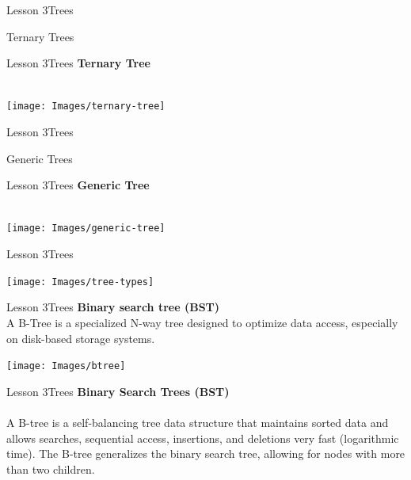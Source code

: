 \documentclass[aspectratio=1610]{beamer}
\begin{document}
\begin{frame}{Lesson 3}{Trees}
\begin{center}
\huge Ternary Trees
\end{center}
\end{frame}

\begin{frame}{Lesson 3}{Trees}
\LARGE
\textbf{Ternary Tree}\\~\\
\begin{center}
\texttt{[image: Images/ternary-tree]}
\end{center}
\end{frame}

\begin{frame}{Lesson 3}{Trees}
\begin{center}
\huge Generic Trees
\end{center}
\end{frame}

\begin{frame}{Lesson 3}{Trees}
\LARGE
\textbf{Generic Tree}\\~\\
\begin{center}
\texttt{[image: Images/generic-tree]}
\end{center}
\end{frame}

\begin{frame}{Lesson 3}{Trees}
\begin{center}
\texttt{[image: Images/tree-types]}
\end{center}
\end{frame}


\begin{frame}{Lesson 3}{Trees}
\LARGE
\textbf{Binary search tree (BST)}\\
A B-Tree is a specialized N-way tree designed to optimize data
access, especially on disk-based storage systems.
\begin{center}
\texttt{[image: Images/btree]}
\end{center}
\end{frame}

\begin{frame}{Lesson 3}{Trees}
\LARGE
\textbf{Binary Search Trees (BST)}\\~\\
\Large
A B-tree is a \alert{self-balancing} tree data structure that
maintains sorted data and allows searches, sequential access,
insertions, and deletions very fast (logarithmic time). The B-tree
generalizes the binary search tree, allowing for nodes with more
than two children.
\end{frame}
\end{document}
